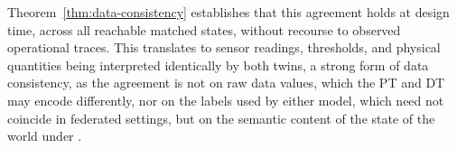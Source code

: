 Theorem~\ref{thm:data-consistency} establishes that this agreement holds at design time, across all reachable matched states, without recourse to observed operational traces. This translates to sensor readings, thresholds, and physical quantities being interpreted identically by both twins, a strong form of data consistency, as the agreement is not on raw data values, which the PT and DT may encode differently, nor on the labels used by either model, which need not coincide in federated settings, but on the semantic content of the state of the world under \DomainKnowledge.









